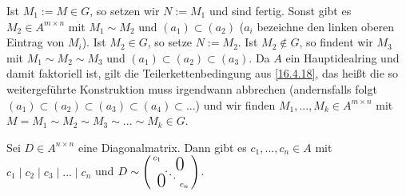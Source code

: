 \documentclass[../../main.tex]{subfiles}
\begin{document}
\begin{cproof}
\noindent Ist $M_1:=M\in G$, so setzen wir $N:=M_1$ und sind fertig. Sonst gibt es $M_2\in A^{m\times n}$ mit $M_1\sim M_2$ und $(a_1)\subset(a_2)$ ($a_i$ bezeichne den linken oberen Eintrag von $M_i$). Ist $M_2\in G$, so setze $N:=M_2$. Ist $M_2\notin G$, so findent wir $M_3$ mit $M_1\sim M_2\sim M_3$ und $(a_1)\subset(a_2)\subset (a_3)$. Da $A$ ein Hauptidealring und damit faktoriell ist, gilt die Teilerkettenbedingung aus \ref{16.4.18}, das heißt die so weitergeführte Konstruktion muss irgendwann abbrechen (andernsfalls folgt $(a_1)\subset(a_2)\subset(a_3)\subset(a_4)\subset...$) und wir finden $M_1,...,M_k\in A^{m\times n}$ mit $M=M_1\sim M_2\sim M_3\sim...\sim M_k\in G$.
\end{cproof}

\begin{lem}\label{17.1.10}
Sei $D\in A^{n\times n}$ eine Diagonalmatrix. Dann gibt es $c_1,...,c_n\in A$ mit $c_1\mid c_2\mid c_3\mid ...\mid c_n$ und $D\sim \left(\begin{smallmatrix}
c_1 & & \llap{$\overset{\blap{\LARGE 0}}{~}$} \\
& \ddots &\\
\rlap{\tlap{\LARGE 0}} & & c_n
\end{smallmatrix}\right)$.
\end{lem}
\end{document}
